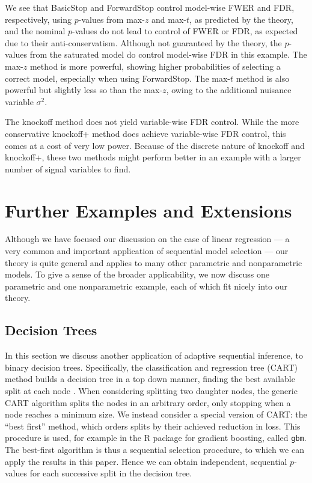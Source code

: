 \documentclass{article}
\begin{document}
We see that BasicStop and ForwardStop control model-wise FWER and FDR, respectively, using $p$-values from max-$z$ and max-$t$, as predicted by the theory, and the nominal $p$-values do not lead to control of FWER or FDR, as expected due to their anti-conservatism. Although not guaranteed by the theory, the $p$-values from the saturated model do control model-wise FDR in this example.  The max-$z$ method is more powerful, showing higher probabilities of selecting a correct model, especially when using ForwardStop. The max-$t$ method is also powerful but slightly less so than the max-$z$, owing to the additional nuisance variable $\sigma^2$.

The knockoff method does not yield variable-wise FDR control. While the more conservative knockoff+ method does achieve variable-wise FDR control, this comes at a cost of very low power. Because of the discrete nature of knockoff and knockoff+, these two methods might perform better in an example with a larger number of signal variables to find.

\section{Further Examples and Extensions}\label{sec:further-examples}

Although we have focused our discussion on the case of linear regression --- a very common and important application of sequential model selection --- our theory is quite general and applies to many other parametric and nonparametric models. To give a sense of the broader applicability, we now discuss one parametric and one nonparametric example, each of which fit nicely into our theory.

\subsection{Decision Trees}
In this section we discuss another application of adaptive sequential inference, to binary decision trees. Specifically, the classification and regression tree  (CART)  method builds a decision tree in a top down manner, finding the best available split at each node \citep{breiman1984classification}.  When considering splitting two daughter nodes, the generic CART algorithm splits the nodes in an arbitrary order, only stopping when a node reaches a minimum size.  We instead consider a  special version of CART: the ``best first'' method, which orders splits by their achieved reduction in loss. This procedure is used, for example in the R package for gradient boosting, called {\tt gbm}. The best-first algorithm is thus a sequential selection  procedure, to which we can apply the results in this paper. Hence we can obtain independent, sequential $p$-values for each successive split in the decision tree. 
\end{document}

